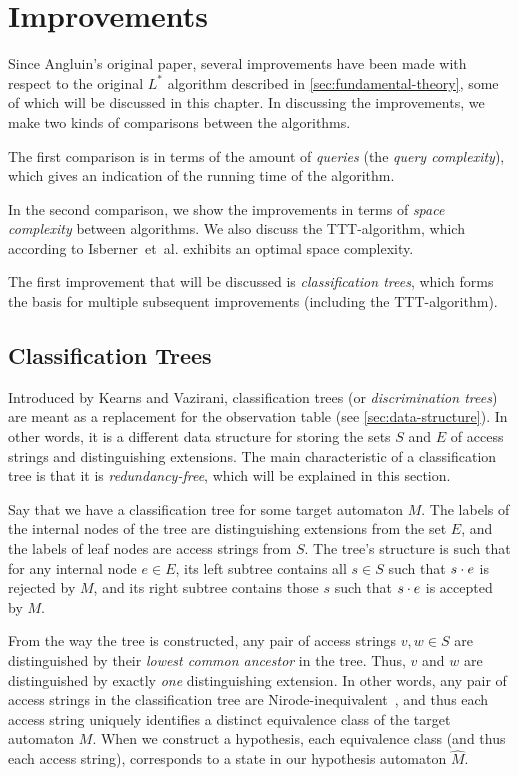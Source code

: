 \documentclass[multi,crop=false,class=article]{standalone}
\begin{document}
\section{Improvements}
\label{sec:improvements}
Since Angluin's original paper, several improvements have been made with respect
to the original $L^*$ algorithm described in \cref{sec:fundamental-theory},
some of which will be discussed in this chapter.
In discussing the improvements, we make two kinds of comparisons
between the algorithms.

The first comparison is in terms of the amount of
\textit{queries} (the \textit{query complexity}), which gives an indication of
the running time of the algorithm.

In the second comparison, we show the improvements in terms of \textit{space
 complexity} between algorithms. We also discuss the TTT-algorithm, which according
to Isberner~et~al. exhibits an optimal space complexity\cite{Isberner14b}.

The first improvement that will be discussed is \textit{classification
 trees}, which forms the basis for multiple subsequent improvements (including
the TTT-algorithm).

\subsection{Classification Trees}
\label{sec:classification-trees}
Introduced by Kearns and Vazirani\cite{Kearns94}, classification trees (or
\textit{discrimination trees}) are meant as a replacement for the observation
table (see \cref{sec:data-structure}). In other words, it is a different data
structure for storing the sets $S$ and $E$ of access strings and distinguishing
extensions. The main characteristic of a classification tree is that it is
\textit{redundancy-free}, which will be explained in this section.

Say that we have a classification tree for some target automaton $M$. The labels
of the internal nodes of the tree are distinguishing extensions from the set
$E$, and the labels of leaf nodes are access strings from $S$. The tree's
structure is such that for any internal node $e \in E$, its left subtree
contains all $s \in S$ such that $s \cdot e$ is rejected by $M$, and its right
subtree contains those $s$ such that $s \cdot e$ is accepted by $M$.

From the way the tree is constructed, any pair of access strings $v,w \in S$ are
distinguished by their \textit{lowest common ancestor} in the tree. Thus, $v$
and $w$ are distinguished by exactly \textit{one} distinguishing extension. In
other words, any pair of access strings in the classification tree are
Nirode-inequivalent~, and thus each access
string uniquely identifies a distinct equivalence class of the target automaton
$M$. When we construct a hypothesis, each equivalence class (and thus each
access string), corresponds to a state in our hypothesis automaton $\hat M$.
\end{document}
